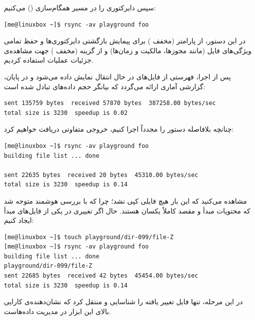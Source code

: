 سپس دایرکتوری  را در مسیر  همگام‌سازی () می‌کنیم:

\begin{latin}
\begin{lstlisting}
[me@linuxbox ~]$ rsync -av playground foo
\end{lstlisting}
\end{latin}

در این دستور، از پارامتر  (مخفف ) برای پیمایش بازگشتی دایرکتوری‌ها و حفظ تمامی ویژگی‌های فایل (مانند مجوزها، مالکیت و زمان‌ها) و از گزینه  (مخفف ) جهت مشاهده‌ی جزئیات عملیات استفاده کردیم.

پس از اجرا، فهرستی از فایل‌های در حال انتقال نمایش داده می‌شود و در پایان، گزارشی آماری ارائه می‌گردد که بیانگر حجم داده‌های تبادل شده است:

\begin{latin}
\begin{lstlisting}
sent 135759 bytes  received 57870 bytes  387258.00 bytes/sec
total size is 3230  speedup is 0.02
\end{lstlisting}
\end{latin}

چنانچه بلافاصله دستور را مجدداً اجرا کنیم، خروجی متفاوتی دریافت خواهیم کرد:

\begin{latin}
\begin{lstlisting}
[me@linuxbox ~]$ rsync -av playground foo
building file list ... done

sent 22635 bytes  received 20 bytes  45310.00 bytes/sec
total size is 3230  speedup is 0.14
\end{lstlisting}
\end{latin}

مشاهده می‌کنید که این بار هیچ فایلی کپی نشد؛ چرا که  با بررسی هوشمند متوجه شد که محتویات مبدأ و مقصد کاملاً یکسان هستند. حال اگر تغییری در یکی از فایل‌های مبدأ ایجاد کنیم:

\begin{latin}
\begin{lstlisting}
[me@linuxbox ~]$ touch playground/dir-099/file-Z
[me@linuxbox ~]$ rsync -av playground foo
building file list ... done
playground/dir-099/file-Z
sent 22685 bytes  received 42 bytes  45454.00 bytes/sec
total size is 3230  speedup is 0.14
\end{lstlisting}
\end{latin}

در این مرحله،  تنها فایل تغییر یافته را شناسایی و منتقل کرد که نشان‌دهنده‌ی کارایی بالای این ابزار در مدیریت داده‌هاست.

